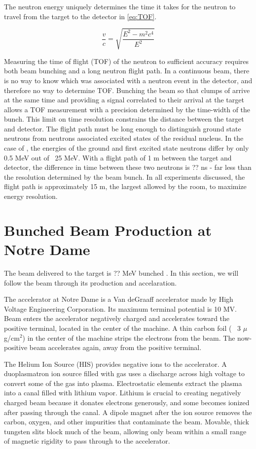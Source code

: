 The neutron energy uniquely determines the time it takes for the neutron to travel from the target to the detector in \eq \ref{eq:TOF}.  

\begin{equation}
\frac{v}{c} = \sqrt{\frac{E^2 - m^2c^4}{E^2}}
\label{eq:TOF}
\end{equation}

Measuring the time of flight (TOF) of the neutron to sufficient accuracy requires both beam bunching and a long neutron flight path.  In a continuous beam, there is no way to know which  was associated with a neutron event in the detector, and therefore no way to determine TOF.  Bunching the beam so that clumps of  arrive at the same time and providing a signal correlated to their arrival at the target allows a TOF measurement with a precision determined by the time-width of the bunch.  This limit on time resolution constrains the distance between the target and detector.  The flight path must be long enough to distinguish ground state neutrons from neutrons associated excited states of the residual nucleus.  In the case of ,  the energies of the ground and first excited state neutrons differ by only 0.5 MeV out of ~25 MeV.  With a flight path of 1 m between the target and detector, the difference in time between these two neutrons is ?? ns - far less than the resolution determined by the beam bunch.  In all experiments discussed, the flight path is approximately 15 m, the largest allowed by the room, to maximize energy resolution.  

\section{Bunched Beam Production at Notre Dame}
The beam delivered to the target is ?? MeV bunched .  In this section, we will follow the beam through its production and accelaration.

The accelerator at Notre Dame is a Van deGraaff accelerator made by High Voltage Engineering Corporation.  Its maximum terminal potential is 10 MV.  Beam enters the accelerator negatively charged and accelerates toward the positive terminal, located in the center of the machine. A thin carbon foil (~ 3 $\mu$g/cm$^2$) in the center of the machine strips the electrons from the beam.  The now-positive beam accelerates again, away from the positive terminal.  

The Helium Ion Source (HIS) provides negative  ions to the accelerator.  A duoplasmatron ion source filled with  gas uses a discharge across high voltage to convert some of the gas into plasma.  Electrostatic elements extract the plasma into a canal filled with lithium vapor.  Lithium is crucial to creating negatively charged beam because it donates electrons generously, and some  becomes ionized after passing through the canal.  A dipole magnet after the ion source removes the carbon, oxygen, and other impurities that contaminate the  beam.  Movable, thick tungsten slits block much of the beam, allowing only beam within a small range of magnetic rigidity to pass through to the accelerator.

